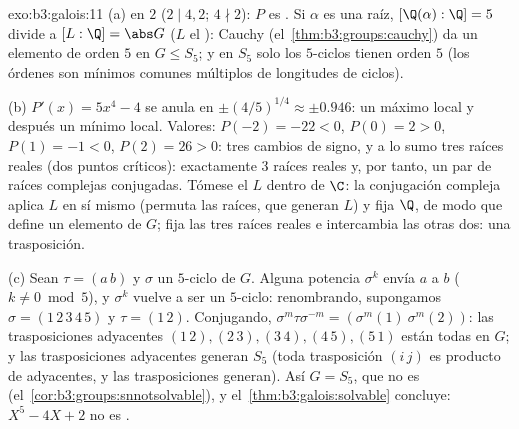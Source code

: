 \begin{solution}{exo:b3:galois:11}
(a)  en $2$ ($2 \mid 4, 2$;
$4 \nmid 2$): $P$ es . Si
$\alpha$ es una raíz, $[\Q(\alpha):\Q] = 5$ divide a $[L:\Q] = \abs G$
($L$ el ):
Cauchy (el~\cref{thm:b3:groups:cauchy}) da un elemento de orden $5$ en
$G \leq S_5$; y en $S_5$ solo los $5$-ciclos tienen orden $5$ (los
órdenes son mínimos comunes múltiplos de longitudes de ciclos).

(b) $P'(x) = 5x^4 - 4$ se anula en $\pm(4/5)^{1/4} \approx \pm
0.946$: un máximo local y después un mínimo local. Valores: $P(-2)
= -22 < 0$, $P(0) = 2 > 0$, $P(1) = -1 < 0$, $P(2) = 26 > 0$: tres
cambios de signo, y a lo sumo tres raíces reales (dos puntos críticos):
exactamente $3$ raíces reales y, por tanto, un par de raíces complejas
conjugadas. Tómese el  $L$ dentro de $\C$: la conjugación compleja aplica $L$
en sí mismo (permuta las raíces, que generan $L$) y fija $\Q$, de modo
que define un elemento de $G$; fija las tres raíces reales e intercambia
las otras dos: una trasposición.

(c) Sean $\tau = (a\,b)$ y $\sigma$ un $5$-ciclo de $G$. Alguna potencia
$\sigma^k$ envía $a$ a $b$ ($k \ne 0 \bmod 5$), y $\sigma^k$ vuelve a
ser un $5$-ciclo: renombrando, supongamos $\sigma =
(1\,2\,3\,4\,5)$ y $\tau = (1\,2)$. Conjugando,
$\sigma^m\tau\sigma^{-m} = (\sigma^m(1)\ \sigma^m(2))$: las
trasposiciones adyacentes $(1\,2), (2\,3), (3\,4), (4\,5),
(5\,1)$ están todas en $G$; y las trasposiciones adyacentes generan
$S_5$ (toda trasposición $(i\,j)$ es producto de adyacentes, y las
trasposiciones generan). Así $G = S_5$, que no es
(el~\cref{cor:b3:groups:snnotsolvable}), y
el~\cref{thm:b3:galois:solvable} concluye: $X^5 - 4X + 2$ no es
.
\end{solution}

